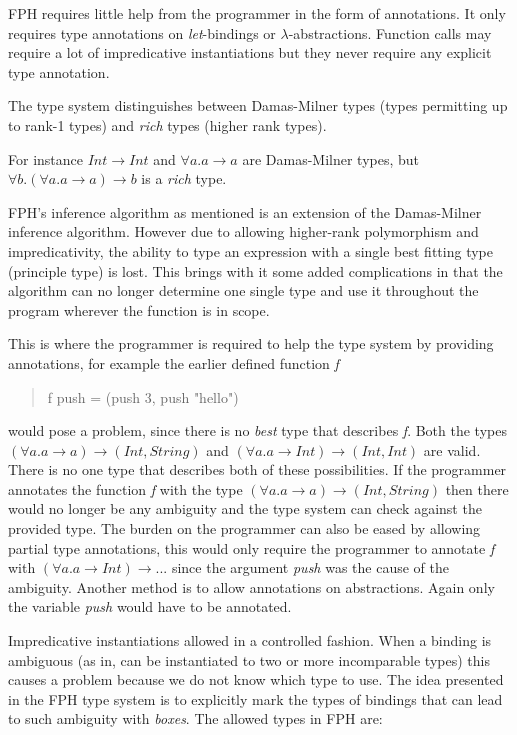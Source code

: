\documentclass[twoside, titlepage, openright, a4paper]{book}
\begin{document}
FPH requires little help from the programmer in the form of annotations. It only requires type annotations on \textit{let}-bindings or $\lambda$-abstractions. Function calls may require a lot of impredicative instantiations but they never require any explicit type annotation.

The type system distinguishes between Damas-Milner types (types permitting up to rank-1 types) and \textit{rich} types (higher rank types).

For instance $Int \rightarrow Int$ and $\forall a. a \rightarrow a$ are Damas-Milner types, but $\forall b.(\forall a. a \rightarrow a) \rightarrow b$ is a \textit{rich} type.

FPH's inference algorithm as mentioned is an extension of the Damas-Milner inference algorithm. However due to allowing higher-rank polymorphism and impredicativity, the ability to type an expression with a single best fitting type (principle type) is lost. This brings with it some added complications in that the algorithm can no longer determine one single type and use it throughout the program wherever the function is in scope.

This is where the programmer is required to help the type system by providing annotations, for example the earlier defined function \emph{f}
\begin{quotation}
f push = (push 3, push "hello")
\end{quotation}
would pose a problem, since there is no \emph{best} type that describes \emph{f}. Both the types $(\forall a. a \rightarrow a) \rightarrow (Int, String)$ and $(\forall a. a \rightarrow Int) \rightarrow (Int, Int)$ are valid. There is no one type that describes both of these possibilities.
If the programmer annotates the function \emph{f} with the type $(\forall a. a \rightarrow a) \rightarrow (Int, String)$ then there would no longer be any ambiguity and the type system can check against the provided type.
The burden on the programmer can also be eased by allowing partial type annotations, this would only require the programmer to annotate \emph{f} with $(\forall a. a \rightarrow Int) \rightarrow ...$ since the argument \emph{push} was the cause of the ambiguity. Another method is to allow annotations on abstractions. Again only the variable \emph{push} would have to be annotated.

Impredicative instantiations allowed in a controlled fashion. When a binding is ambiguous (as in, can be instantiated to two or more incomparable types) this causes a problem because we do not know which type to use. The idea presented in the FPH type system is to explicitly mark the types of bindings that can lead to such ambiguity with \textit{boxes}. The allowed types in FPH are:
\end{document}

